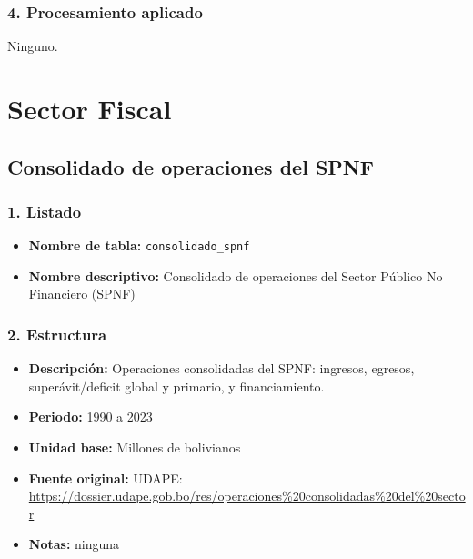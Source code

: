 \documentclass[12pt,a4paper]{article}
\begin{document}
\subsubsection*{4. Procesamiento aplicado}
Ninguno.





\section{Sector Fiscal}

\subsection{Consolidado de operaciones del SPNF}

\subsubsection*{1. Listado}
\begin{itemize}
  \item \textbf{Nombre de tabla:} \texttt{consolidado\_spnf}
  \item \textbf{Nombre descriptivo:} Consolidado de operaciones del Sector Público No Financiero (SPNF)
\end{itemize}

\subsubsection*{2. Estructura}
\begin{itemize}
  \item \textbf{Descripción:} Operaciones consolidadas del SPNF: ingresos, egresos, superávit/deficit global y primario, y financiamiento.
  \item \textbf{Periodo:} 1990 a 2023
  \item \textbf{Unidad base:} Millones de bolivianos
  \item \textbf{Fuente original:} UDAPE:\\
    \url{https://dossier.udape.gob.bo/res/operaciones%20consolidadas%20del%20sector}
  \item \textbf{Notas:} ninguna
\end{itemize}
\end{document}
